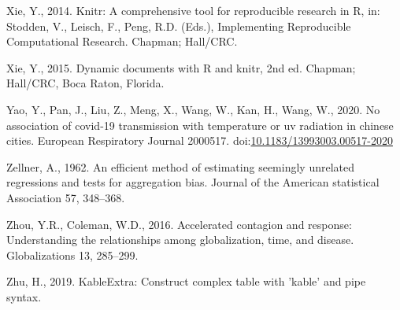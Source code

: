 \documentclass[]{elsarticle} %
\begin{document}
\leavevmode\hypertarget{ref-Xie2014}{}%
Xie, Y., 2014. Knitr: A comprehensive tool for reproducible research in
R, in: Stodden, V., Leisch, F., Peng, R.D. (Eds.), Implementing
Reproducible Computational Research. Chapman; Hall/CRC.

\leavevmode\hypertarget{ref-Xie2015}{}%
Xie, Y., 2015. Dynamic documents with R and knitr, 2nd ed. Chapman;
Hall/CRC, Boca Raton, Florida.

\leavevmode\hypertarget{ref-Yao2020association}{}%
Yao, Y., Pan, J., Liu, Z., Meng, X., Wang, W., Kan, H., Wang, W., 2020.
No association of covid-19 transmission with temperature or uv radiation
in chinese cities. European Respiratory Journal 2000517.
doi:\href{https://doi.org/10.1183/13993003.00517-2020}{10.1183/13993003.00517-2020}

\leavevmode\hypertarget{ref-Zellner1962efficient}{}%
Zellner, A., 1962. An efficient method of estimating seemingly unrelated
regressions and tests for aggregation bias. Journal of the American
statistical Association 57, 348--368.

\leavevmode\hypertarget{ref-Zhou2016accelerated}{}%
Zhou, Y.R., Coleman, W.D., 2016. Accelerated contagion and response:
Understanding the relationships among globalization, time, and disease.
Globalizations 13, 285--299.

\leavevmode\hypertarget{ref-Zhu2019}{}%
Zhu, H., 2019. KableExtra: Construct complex table with 'kable' and pipe
syntax.
\end{document}
